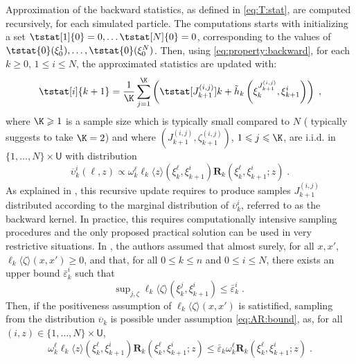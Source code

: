 \documentclass[12pt]{article}
\newcommand{\addf}[1]{\termletter_{#1}}
\newcommand{\termletter}{\tilde{h}}
\newcommand{\N}{N}
\newcommand{\hkup}{\bar{\varepsilon}}
\newcommand{\bi}[3]{J_{#1}^{(#2, #3)}}
\newcommand{\eqsp}{\;}
\newcommand{\ewght}[2]{\ensuremath{\omega_{#1}^{#2}}}
\newcommand{\epart}[2]{\ensuremath{\xi_{#1}^{#2}}}
\newcommand{\marginalset}{\mathsf{U}}
\newcommand{\kernelmarg}{\mathbf{R}}
\newcommand{\hatqg}[1]{\mathsf{\ell}_{#1}}
\begin{document}
Approximation of the backward statistics, as defined in \eqref{eq:T:stat}, are computed recursively, for each simulated particle. 
The computations starts with initializing a set $\tstat[1]{0} = 0,\dots \tstat[N]{0} = 0$, corresponding to the values of $\tstat{0}(\epart{0}{1}), \dots, \tstat{0}(\epart{0}{N})$.  Then, using \eqref{eq:property:backward}, for each $k\geqslant 0$, $1\leqslant i\leqslant \N$, the approximated statistics are updated with:
\begin{equation}
\label{eq:update:paris:marginal}
\tstat[i]{k+1}  = \frac{1}{\K} \sum_{j=1}^{\K} \left( \tstat[\bi{k+1}{i}{j}]{k} + \addf{k}\left(\epart{k}{\bi{k+1}{i}{j}}, \epart{k+1}{i}\right)\right)\eqsp,
\end{equation}
where $\K\geqslant 1$ is a sample size which  is typically small compared to $\N$ (\citealp{olsson2017efficient} typically suggests to take $\K = 2$) and where $(\bi{k+1}{i}{j},\zeta_{k+1}^{(i,j)})$, $1\leqslant j\leqslant \K$, are i.i.d. in $\{1,\ldots,\N\}\times\marginalset$ with distribution 
$$
\overline \upsilon_k^i(\ell,z)\propto\ewght{k}{\ell}\hatqg{k}\langle z\rangle(\epart{k}{\ell},\epart{k+1}{i})\kernelmarg_{k}(\epart{k}{\ell},\epart{k+1}{i};z)\eqsp.
$$
As explained in \cite{gloaguen2021pseudo}, this recursive update requires to produce samples $\bi{k+1}{i}{j}$ distributed according to the marginal  distribution of $\overline \upsilon_k^i$, referred to as the backward kernel. In practice, this requires computationally intensive sampling procedures and the only proposed practical solution can be used in very restrictive situations.  
In \cite{gloaguen2018online}, the authors assumed that  almost surely, for all $x,x'$, $\hatqg{k}\langle \zeta\rangle(x, x')\geqslant 0$, and that, for all  $0\leqslant k\leqslant n$ and $0\leqslant i\leqslant N$, there exists an upper bound $\hkup^i_k$  such that
\begin{equation}
\mathrm{sup}_{j,\zeta}\;\hatqg{k}\langle \zeta\rangle(\epart{k}{j},\epart{k+1}{i})\leqslant \hkup^i_k\eqsp. \label{eq:AR:bound}
\end{equation}
Then,  if the positiveness assumption of  $\hatqg{k}\langle \zeta\rangle(x, x')$ is satistified, sampling from the distribution $\overline\upsilon_k$ is possible under assumption \eqref{eq:AR:bound}, as, for all $(i, z) \in \lbrace 1,\dots,N\rbrace\times\marginalset$, 
$$
\ewght{k}{\ell}\hatqg{k}\langle z \rangle(\epart{k}{\ell},\epart{k+1}{i})\kernelmarg_{k}(\epart{k}{\ell},\epart{k+1}{i};z) \leqslant \hkup_k \ewght
{k}{\ell} \kernelmarg_{k}(\epart{k}{\ell},\epart{k+1}{i};z)\eqsp. 
$$
\end{document}
